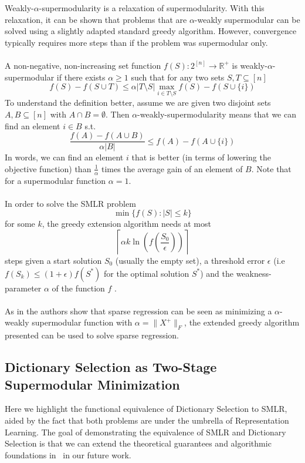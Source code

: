 \documentclass{article}
\begin{document}
Weakly-$\alpha$-supermodularity is a relaxation of supermodularity. With this relaxation, it can be shown that problems that are $\alpha$-weakly supermodular can be solved using a slightly adapted standard greedy algorithm. However, convergence typically requires more steps than  if the problem was supermodular only.
\\
\\
A non-negative, non-increasing set function $f(S): 2^{[n]} \rightarrow \mathbb{R}^+$ is weakly-$\alpha$-supermodular if there exists $\alpha \geq 1$ such that for any two sets $S, T \subseteq [n]$
\[f(S) - f(S \cup T) \leq \alpha \vert T \setminus S\vert \max_{i \in T \setminus S} f(S) - f(S \cup \lbrace i \rbrace) \]
To understand the definition better, assume we are given two disjoint sets $A, B \subseteq [n]$ with $A \cap B = \emptyset$. Then $\alpha$-weakly-supermodularity means that we can find an element $i \in B$ s.t. 
\[
\frac{f(A) - f(A \cup B)}{\alpha \vert B\vert} \leq f(A) - f(A \cup \lbrace i \rbrace)
\]
In words, we can find an element $i$ that is better (in terms of lowering the objective function) than $\frac{1}{\alpha}$ times the average gain of an element of $B$. Note that for a supermodular function $\alpha = 1$.
\\
\\
In order to solve the SMLR problem 
\[\min \lbrace f(S) : \vert S \vert \leq k \rbrace \]
for some $k$, the greedy extension algorithm needs at most 
\[ \left\lceil \alpha k \ln \left(f\left(\frac{S_0}{\epsilon}\right)\right)\right\rceil \]
 steps given a start solution $S_0$ (usually the empty set), a threshold error $\epsilon$ (i.e $f(S_k) \leq (1+\epsilon)f(S^*)$ for the optimal solution $S^*$) and the weakness-parameter $\alpha$ of the function $f$ \cite{weaklyalpha}.
 \\
 \\
As in \cite{weaklyalpha} the authors show that sparse regression can be seen as minimizing a $\alpha$-weakly supermodular function with $\alpha = \| X^+ \|_F$, the extended greedy algorithm presented can be used to solve sparse regression.

\subsection{Dictionary Selection as Two-Stage Supermodular Minimization} \label{supermodTwoStage}

Here we highlight the functional equivalence of Dictionary Selection to SMLR, aided by the fact that both problems are under the umbrella of Representation Learning. The goal of demonstrating the equivalence of SMLR and Dictionary Selection is that we can extend the theoretical guarantees and algorithmic foundations in~\cite{weaklyalpha} in our future work. \\
\end{document}
